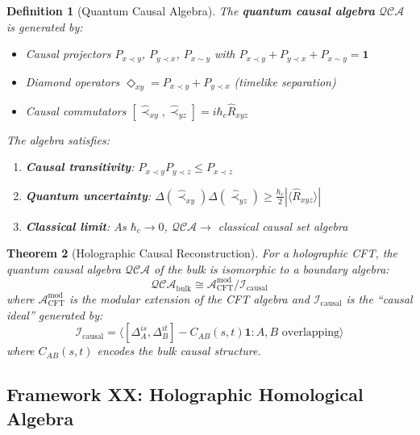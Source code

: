 \documentclass[12pt,a4paper]{article}
\newtheorem{theorem}{Theorem}[section]
\newtheorem{definition}[theorem]{Definition}
\begin{document}
\begin{definition}[Quantum Causal Algebra]\label{def:qca}
The \textbf{quantum causal algebra} $\mathcal{QCA}$ is generated by:
\begin{itemize}
    \item Causal projectors $P_{x \prec y}$, $P_{y \prec x}$, $P_{x \sim y}$ with $P_{x\prec y} + P_{y \prec x} + P_{x \sim y} = \mathbf{1}$
    \item Diamond operators $\Diamond_{xy} = P_{x \prec y} + P_{y \prec x}$ (timelike separation)
    \item Causal commutators $[\hat{\prec}_{xy}, \hat{\prec}_{yz}] = i\hbar_c \hat{R}_{xyz}$
\end{itemize}

The algebra satisfies:
\begin{enumerate}
    \item \textbf{Causal transitivity}: $P_{x \prec y} P_{y \prec z} \leq P_{x \prec z}$
    \item \textbf{Quantum uncertainty}: $\Delta(\hat{\prec}_{xy}) \Delta(\hat{\prec}_{yz}) \geq \frac{\hbar_c}{2} |\langle \hat{R}_{xyz} \rangle|$
    \item \textbf{Classical limit}: As $\hbar_c \to 0$, $\mathcal{QCA} \to$ classical causal set algebra
\end{enumerate}
\end{definition}

\begin{theorem}[Holographic Causal Reconstruction]\label{thm:holographic-causal}
For a holographic CFT, the quantum causal algebra $\mathcal{QCA}$ of the bulk is isomorphic to a boundary algebra:
\begin{equation}
\mathcal{QCA}_{\text{bulk}} \cong \mathcal{A}_{\text{CFT}}^{\text{mod}} / \mathcal{I}_{\text{causal}}
\end{equation}
where $\mathcal{A}_{\text{CFT}}^{\text{mod}}$ is the modular extension of the CFT algebra and $\mathcal{I}_{\text{causal}}$ is the ``causal ideal'' generated by:
\begin{equation}
\mathcal{I}_{\text{causal}} = \langle [\Delta_A^{is}, \Delta_B^{it}] - C_{AB}(s,t) \mathbf{1} : A, B \text{ overlapping} \rangle
\end{equation}
where $C_{AB}(s,t)$ encodes the bulk causal structure.
\end{theorem}

\subsection{Framework XX: Holographic Homological Algebra}
\end{document}
